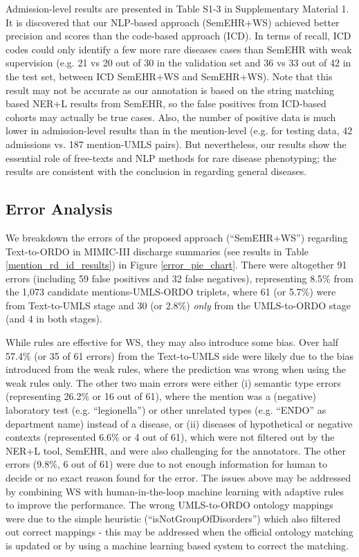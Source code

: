 \documentclass[twocolumn]{bmcart}
\begin{document}
Admission-level results are presented in Table S1-3 in Supplementary Material 1. It is discovered that our NLP-based approach (SemEHR+WS) achieved better precision and  scores than the code-based approach (ICD). In terms of recall, ICD codes could only identify a few more rare diseases cases than SemEHR with weak supervision (e.g. 21 vs 20 out of 30 in the validation set and 36 vs 33 out of 42 in the test set, between ICD  SemEHR+WS and SemEHR+WS). Note that this result may not be accurate as our annotation is based on the string matching based NER+L results from SemEHR, so the false positives from ICD-based cohorts may actually be true cases. Also, the number of positive data is much lower in admission-level results than in the mention-level (e.g. for testing data, 42 admissions vs. 187 mention-UMLS pairs). But nevertheless, our results show the essential role of free-texts and NLP methods for rare disease phenotyping; the results are consistent with the conclusion in \cite{Ford2016} regarding general diseases.

\subsection*{Error Analysis}
\label{subsec:error_analysis}
We breakdown the errors of the proposed approach (``SemEHR+WS'') regarding Text-to-ORDO in MIMIC-III discharge summaries (see results in Table \ref{mention_rd_id_results}) in Figure \ref{error_pie_chart}. There were altogether 91 errors (including 59 false positives and 32 false negatives), representing 8.5\% from the 1,073 candidate mentions-UMLS-ORDO triplets, where 61 (or 5.7\%) were from Text-to-UMLS stage and 30 (or 2.8\%) \emph{only} from the UMLS-to-ORDO stage (and 4 in both stages).

While rules are effective for WS, they may also introduce some bias. Over half 57.4\% (or 35 of 61 errors) from the Text-to-UMLS side were likely due to the bias introduced from the weak rules, where the prediction was wrong when using the weak rules only. The other two main errors were either (i) semantic type errors (representing 26.2\% or 16 out of 61), where the mention was a (negative) laboratory test (e.g. ``legionella'') or other unrelated types (e.g. ``ENDO'' as department name) instead of a disease, or (ii) diseases of hypothetical or negative contexts (represented 6.6\% or 4 out of 61), which were not filtered out by the NER+L tool, SemEHR, and were also challenging for the annotators. The other errors (9.8\%, 6 out of 61) were due to not enough information for human to decide or no exact reason found for the error. The issues above may be addressed by combining WS with human-in-the-loop machine learning \cite{monarch2021} with adaptive rules to improve the performance. The wrong UMLS-to-ORDO ontology mappings were due to the simple heuristic (``isNotGroupOfDisorders'') which also filtered out correct mappings - this may be addressed when the official ontology matching is updated or by using a machine learning based system to correct the matching.
\end{document}
